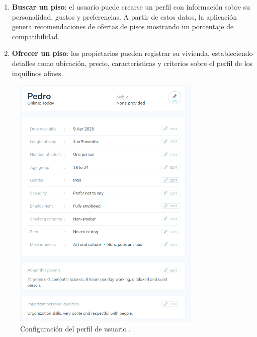 \begin{enumerate}[label=\arabic*)]
    \item \textbf{Buscar un piso}: el usuario puede crearse un perfil con información sobre su personalidad, gustos y preferencias. A partir de estos datos, la aplicación genera recomendaciones de ofertas de pisos mostrando un porcentaje de compatibilidad.
    \item \textbf{Ofrecer un piso}: los propietarios pueden registrar su vivienda, estableciendo detalles como ubicación, precio, características y criterios sobre el perfil de los inquilinos afines.
\end{enumerate}
\newpage
\begin{figure}[H]
    \centering
    \includegraphics[width=0.8\textwidth]{fotos/perfil-flatmate.png}
    \caption{Configuración del perfil de usuario \textbf{}.}
\end{figure}
